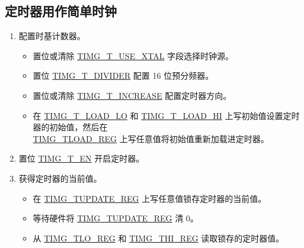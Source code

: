 \documentclass[main\_\_CN.tex]{subfiles}
\begin{document}
\subsection{定时器用作简单时钟}\label{sec:timg-func-descr-simple-clock}
\begin{enumerate}
    \item 配置时基计数器。
        \begin{itemize}
        \item 置位或清除 \hyperref[fielddesc:TIMGTXUSEXTAL]{TIMG\_T\_USE\_XTAL} 字段选择时钟源。
        \item 置位 \hyperref[fielddesc:TIMGTXDIVIDER]{TIMG\_T\_DIVIDER} 配置 16 位预分频器。
        \item 置位或清除 \hyperref[fielddesc:TIMGTXINCREASE]{TIMG\_T\_INCREASE} 配置定时器方向。
        \item 在 \hyperref[fielddesc:TIMGTXLOADLO]{TIMG\_T\_LOAD\_LO} 和 \hyperref[fielddesc:TIMGTXLOADHI]{TIMG\_T\_LOAD\_HI} 上写初始值设置定时器的初始值，然后在 \\\hyperref[regdesc:TIMGTXLOADREG]{TIMG\_TLOAD\_REG} 上写任意值将初始值重新加载进定时器。
    \end{itemize}
    \item 置位 \hyperref[fielddesc:TIMGTXEN]{TIMG\_T\_EN} 开启定时器。
    \item 获得定时器的当前值。
    \begin{itemize}
        \item 在 \hyperref[regdesc:TIMGTXUPDATEREG]{TIMG\_TUPDATE\_REG} 上写任意值锁存定时器的当前值。
        \item 等待硬件将 \hyperref[regdesc:TIMGTXUPDATEREG]{TIMG\_TUPDATE\_REG} 清 0。
        \item 从 \hyperref[regdesc:TIMGTXLOREG]{TIMG\_TLO\_REG} 和 \hyperref[regdesc:TIMGTXHIREG]{TIMG\_THI\_REG} 读取锁存的定时器值。
    \end{itemize}
\end{enumerate}
\end{document}
